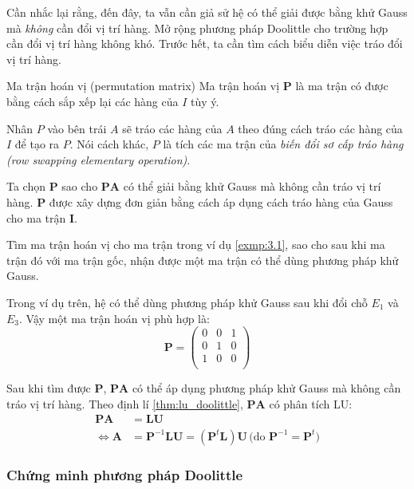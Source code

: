 \documentclass[../../Lectures]{subfiles}
\begin{document}
Cần nhắc lại rằng, đến đây, ta vẫn cần giả sử hệ có thể giải được bằng khử Gauss
mà \emph{không} cần đổi vị trí hàng. Mở rộng phương pháp Doolittle cho trường
hợp cần đổi vị trí hàng không khó. Trước hết, ta cần tìm cách biểu diễn việc
tráo đổi vị trí hàng.

\begin{cdefinition}{Ma trận hoán vị (permutation matrix)}{}
    Ma trận hoán vị \(\bm{P}\) là ma trận có được bằng cách sắp xếp lại các hàng
    của \(I\) tùy ý.
\end{cdefinition}

Nhân \(P\) vào bên trái \(A\) sẽ tráo các hàng của \(A\) theo đúng cách tráo các
hàng của \(I\) để tạo ra \(P\). Nói cách khác, \(P\) là tích các ma trận của
\emph{biến đổi sơ cấp tráo hàng (row swapping elementary operation)}.

Ta chọn \(\bm{P}\) sao cho \(\bm{PA}\) có thể giải bằng khử Gauss mà không cần
tráo vị trí hàng. \(\bm{P}\) được xây dựng đơn giản bằng cách áp dụng cách tráo
hàng của Gauss cho ma trận \(\bm{I}\).

\begin{exmp}
    Tìm ma trận hoán vị cho ma trận trong ví dụ \ref{exmp:3.1}, sao cho sau khi
    ma trận đó với ma trận gốc, nhận được một ma trận có thể dùng phương pháp
    khử Gauss.

    Trong ví dụ trên, hệ có thể dùng phương pháp khử Gauss sau khi đổi chỗ
    \(E_1\) và \(E_3\). Vậy một ma trận hoán vị phù hợp là:
    \[
        \bm{P} =
            \begin{pmatrix}
                0  &  0  &  1  \\
                0  &  1  &  0  \\
                1  &  0  &  0  \\
            \end{pmatrix}
    \]
\end{exmp}

Sau khi tìm được \(\bm{P}\), \(\bm{PA}\) có thể áp dụng phương pháp khử Gauss mà
không cần tráo vị trí hàng. Theo định lí \ref{thm:lu_doolittle}, \(\bm{PA}\) có
phân tích LU:
\begin{align*}
        \bm{PA} &= \bm{LU} \\
    \iff \bm{A} &= \bm{P}^{-1} \bm{LU} = (\bm{P}^t \bm{L}) \bm{U} \, \text{(do \(\bm{P}^{-1} = \bm{P}^t\))}
\end{align*}

\subsubsection{Chứng minh phương pháp Doolittle}
\end{document}

